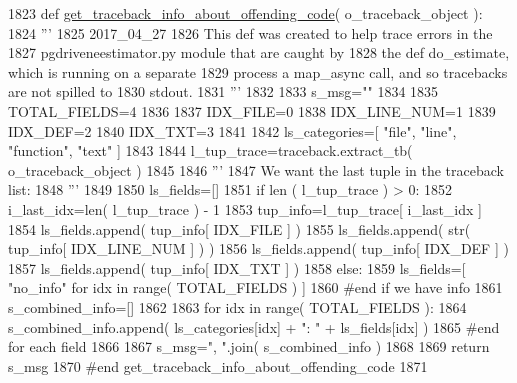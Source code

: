 \begin{DoxyCode}
1823 \textcolor{keyword}{def }\hyperlink{namespacenegui_1_1pgutilities_af7697cf9c85b30c07d7c6fc56df49501}{get\_traceback\_info\_about\_offending\_code}( o\_traceback\_object ):
1824     \textcolor{stringliteral}{'''}
1825 \textcolor{stringliteral}{    2017\_04\_27}
1826 \textcolor{stringliteral}{    This def was created to help trace errors in the}
1827 \textcolor{stringliteral}{    pgdriveneestimator.py module that are caught by}
1828 \textcolor{stringliteral}{    the def do\_estimate, which is running on a separate}
1829 \textcolor{stringliteral}{    process a map\_async call, and so tracebacks are not spilled to}
1830 \textcolor{stringliteral}{    stdout.}
1831 \textcolor{stringliteral}{    '''}
1832 
1833     s\_msg=\textcolor{stringliteral}{""}
1834 
1835     TOTAL\_FIELDS=4
1836 
1837     IDX\_FILE=0
1838     IDX\_LINE\_NUM=1
1839     IDX\_DEF=2
1840     IDX\_TXT=3
1841 
1842     ls\_categories=[ \textcolor{stringliteral}{"file"}, \textcolor{stringliteral}{"line"}, \textcolor{stringliteral}{"function"}, \textcolor{stringliteral}{"text"} ]
1843 
1844     l\_tup\_trace=traceback.extract\_tb( o\_traceback\_object )
1845 
1846     \textcolor{stringliteral}{'''}
1847 \textcolor{stringliteral}{    We want the last tuple in the traceback list:}
1848 \textcolor{stringliteral}{    '''}
1849 
1850     ls\_fields=[]
1851     \textcolor{keywordflow}{if} len ( l\_tup\_trace ) > 0:
1852         i\_last\_idx=len( l\_tup\_trace ) - 1
1853         tup\_info=l\_tup\_trace[ i\_last\_idx ]
1854         ls\_fields.append( tup\_info[ IDX\_FILE ] ) 
1855         ls\_fields.append( str( tup\_info[ IDX\_LINE\_NUM ] ) )
1856         ls\_fields.append( tup\_info[ IDX\_DEF ]  )
1857         ls\_fields.append( tup\_info[ IDX\_TXT ] ) 
1858     \textcolor{keywordflow}{else}:
1859         ls\_fields=[ \textcolor{stringliteral}{"no\_info"} \textcolor{keywordflow}{for} idx \textcolor{keywordflow}{in} range( TOTAL\_FIELDS ) ]
1860     \textcolor{comment}{#end if we have info}
1861     s\_combined\_info=[]
1862 
1863     \textcolor{keywordflow}{for} idx \textcolor{keywordflow}{in} range( TOTAL\_FIELDS ):
1864         s\_combined\_info.append( ls\_categories[idx] + \textcolor{stringliteral}{": "} + ls\_fields[idx] )
1865     \textcolor{comment}{#end for each field}
1866 
1867     s\_msg=\textcolor{stringliteral}{", "}.join( s\_combined\_info )
1868 
1869     \textcolor{keywordflow}{return} s\_msg
1870 \textcolor{comment}{#end get\_traceback\_info\_about\_offending\_code}
1871 
\end{DoxyCode}

